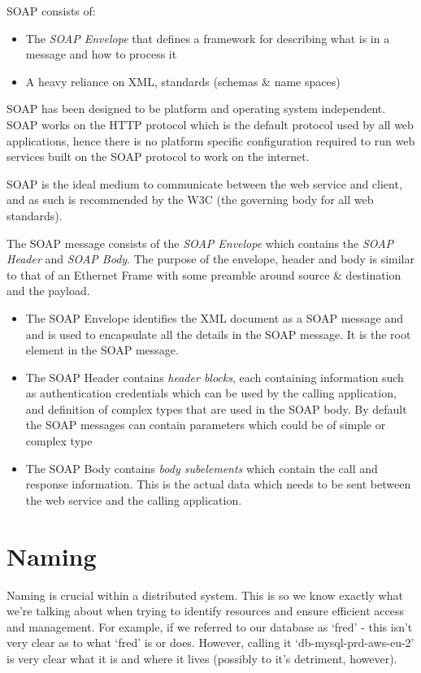 SOAP consists of:
\begin{itemize}
    \item The \textit{SOAP Envelope} that defines a framework for describing what is in a message and how to process it
    \item A heavy reliance on XML, standards (schemas \& name spaces)
\end{itemize}

SOAP has been designed to be platform and operating system independent. SOAP works on the HTTP protocol which is the default protocol used by all web applications, hence there is no platform specific configuration required to run web services built on the SOAP protocol to work on the internet. 

SOAP is the ideal medium to communicate between the web service and client, and as such is recommended by the W3C (the governing body for all web standards).

The SOAP message consists of the \textit{SOAP Envelope} which contains the \textit{SOAP Header} and \textit{SOAP Body}. The purpose of the envelope, header and body is similar to that of an Ethernet Frame with some preamble around source \& destination and the payload.
\begin{itemize}
    \item The SOAP Envelope identifies the XML document as a SOAP message and and is used to encapsulate all the details in the SOAP message. It is the root element in the SOAP message.
    \item The SOAP Header contains \textit{header blocks}, each containing information such as authentication credentials which can be used by the calling application, and definition of complex types that are used in the SOAP body. By default the SOAP messages can contain parameters which could be of simple or complex type 
    \item The SOAP Body contains \textit{body subelements} which contain the call and response information. This is the actual data which needs to be sent between the web service and the calling application. 
\end{itemize}


\section{Naming}
Naming is crucial within a distributed system. This is so we know exactly what we're talking about when trying to identify resources and ensure efficient access and management. For example, if we referred to our database as `fred' - this isn't very clear as to what `fred' is or does. However, calling it `db-mysql-prd-aws-eu-2' is very clear what it is and where it lives (possibly to it's detriment, however). 


